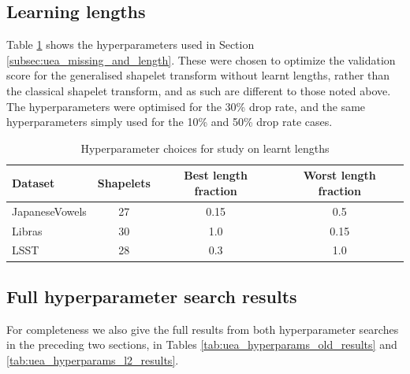 \documentclass{article}
\theoremstyle{plain}
\theoremstyle{definition}
\begin{document}
	\subsection{Learning lengths}

	Table \ref{tab:uea_hyperparams_l2} shows the hyperparameters used in Section \ref{subsec:uea_missing_and_length}. These were chosen to optimize the validation score for the generalised shapelet transform without learnt lengths, rather than the classical shapelet transform, and as such are different to those noted above. The hyperparameters were optimised for the 30\% drop rate, and the same hyperparameters simply used for the 10\% and 50\% drop rate cases.

	\begin{table}[ht]
		\caption{Hyperparameter choices for study on learnt lengths}
		\label{tab:uea_hyperparams_l2}
		\centering
		\begin{tabular}{lccc}
			\toprule
			Dataset & Shapelets & Best length fraction & Worst length fraction \\
			\midrule
			JapaneseVowels  & 27 & 0.15 & 0.5 \\
			Libras          & 30 & 1.0 & 0.15 \\
			LSST            & 28 & 0.3 & 1.0 \\
			\bottomrule
		\end{tabular}
	\end{table}
	
	\subsection{Full hyperparameter search results}
	For completeness we also give the full results from both hyperparameter searches in the preceding two sections, in Tables \ref{tab:uea_hyperparams_old_results} and \ref{tab:uea_hyperparams_l2_results}.
\end{document}
